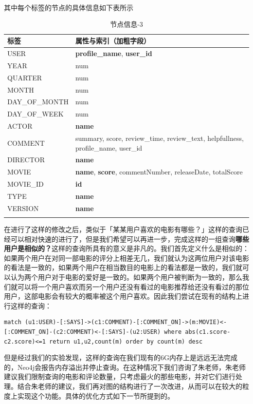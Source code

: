 \documentclass{ctexrep}
\begin{document}
	其中每个标签的节点的具体信息如下表所示\begin{longtable}{l|p{8cm}}
		\hline
		标签 & 属性与索引（加粗字段）  \\
		\hline
		\hline
		USER & \textbf{profile\_name}, \textbf{user\_id }\\
		\hline
		YEAR & num\\
		QUARTER & num \\
		MONTH & num\\
		DAY\_OF\_MONTH & num\\
		DAY\_OF\_WEEK & num \\
		ACTOR & \textbf{name} \\
		COMMENT & summary, score, review\_time, review\_text, helpfullness, profile\_name, user\_id \\
		DIRECTOR & \textbf{name}\\
		MOVIE & \textbf{name}, \textbf{score}, commentNumber, releaseDate, totalScore \\
		MOVIE\_ID & \textbf{id} \\
		TYPE & \textbf{name}\\
		VERSION & \textbf{name}\\
		\hline
		\caption{节点信息-3}
	\end{longtable}
	在进行了这样的修改之后，类似于「某某用户喜欢的电影有哪些？」这样的查询已经可以相对快速的进行了，但是我们希望可以再进一步，完成这样的一组查询\textbf{哪些用户是相似的？}这样的查询所具有的意义是非凡的。我们首先定义什么是相似的：如果两个用户在对同一部电影的评分上相差无几，我们就认为这两位用户对该电影的看法是一致的，如果两个用户在相当数目的电影上的看法都是一致的，我们就可以认为两个用户对于电影的爱好是一致的。如果两个用户被判断为一致的，那么我们就可以将一个用户喜欢而另一个用户还没有看过的电影推荐给还没有看过的那位用户，这部电影会有较大的概率被这个用户喜欢。因此我们尝试在现有的结构上进行这样的查询：\begin{lstlisting}
match (u1:USER)-[:SAYS]->(c1:COMMENT)-[:COMMENT_ON]->(m:MOVIE)<-[:COMMENT_ON]-(c2:COMMENT)<-[:SAYS]-(u2:USER) where abs(c1.score-c2.score)<=1 return u1,u2,count(m) order by count(m) desc
	\end{lstlisting}
	但是经过我们的实验发现，这样的查询在我们现有的6G内存上是远远无法完成的，Neo4j会报告内存溢出并停止查询。在这种情况下我们咨询了朱老师，朱老师建议我们限制查询的电影和评论数量，只考虑最火的那些电影，并对它们进行处理。结合朱老师的建议，我们再对图的结构进行了一次改进，从而可以在较大的粒度上实现这个功能。具体的优化方式如下一节所提到的。
\end{document}
